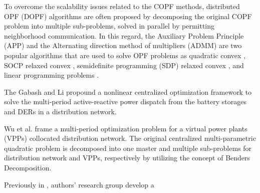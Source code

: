 \documentclass{article}
\begin{document}
To overcome the scalability issues related to the COPF methods, distributed OPF (DOPF) algorithms are often proposed by decomposing the original COPF problem into multiple sub-problems, solved in parallel by permitting neighborhood communication. In this regard, the Auxiliary Problem Principle (APP) and the Alternating direction method of multipliers (ADMM) are two popular algorithms that are used to solve OPF problems as quadratic convex \cite{Fazio}, SOCP relaxed convex \cite{Zheng}, semidefinite programming (SDP) relaxed convex \cite{Wang, Biswas}, and linear programming problems \cite{Paul2}.



The 
Gabash and Li \cite{Gabash} propound a nonlinear centralized optimization framework to solve the multi-period active-reactive power dispatch from the battery storages and DERs in a distribution network. 

Wu et al. \cite{Wu} frame a multi-period optimization problem for a virtual power plants (VPPs) collocated distribution network. The original centralized multi-parametric quadratic problem is decomposed into one master and multiple sub-problems for distribution network and VPPs, respectively by utilizing the concept of Benders Decomposition. 



Previously in \cite{Sadnan}, authors' research group develop a 
\end{document}
